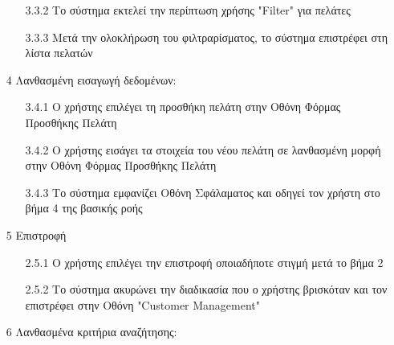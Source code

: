 \documentclass[12pt,a4paper,twoside]{book}
\begin{document}
\begin{enumerate}
\begin{enumerate}
          \item[3.3.2 ] Το σύστημα εκτελεί την περίπτωση χρήσης "Filter" για πελάτες %
          \item[3.3.3 ] Μετά την ολοκλήρωση του φιλτραρίσματος, το σύστημα επιστρέφει στη λίστα πελατών
        \end{enumerate}
  \item[4 ] Λανθασμένη εισαγωγή δεδομένων: %
        \begin{enumerate}
          \item[3.4.1 ] Ο χρήστης επιλέγει τη προσθήκη πελάτη στην Οθόνη Φόρμας Προσθήκης Πελάτη
          \item[3.4.2 ] Ο χρήστης εισάγει τα στοιχεία του νέου πελάτη σε λανθασμένη μορφή στην Οθόνη Φόρμας Προσθήκης Πελάτη
          \item[3.4.3 ] Το σύστημα εμφανίζει Οθόνη Σφάλαματος και οδηγεί τον χρήστη στο βήμα 4 της βασικής ροής %
        \end{enumerate}
  \item[5 ] Επιστροφή
        \begin{enumerate}
          \item[2.5.1 ] Ο χρήστης επιλέγει την επιστροφή οποιαδήποτε στιγμή μετά το βήμα 2 %
          \item[2.5.2 ] Το σύστημα ακυρώνει την διαδικασία που ο χρήστης βρισκόταν και τον επιστρέφει στην Οθόνη "Customer Management" %
        \end{enumerate}
  \item[6 ] Λανθασμένα κριτήρια αναζήτησης:

\end{enumerate}
\end{document}

